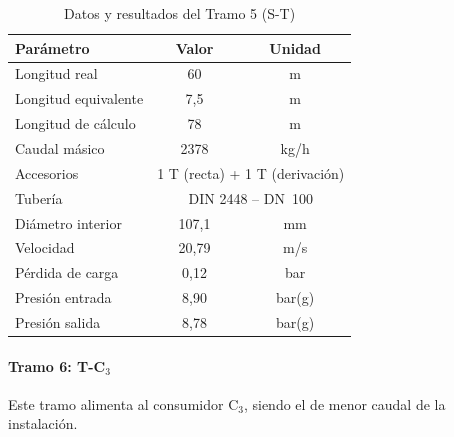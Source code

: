 \documentclass[12pt]{article}
\begin{document}
\begin{table}[H]
	\centering
	\caption{Datos y resultados del Tramo 5 (S-T)}
	\label{tab:tramo5}
	\begin{tabular}{lcc}
		\toprule
		\textbf{Parámetro}   & \textbf{Valor}                                     & \textbf{Unidad} \\
		\midrule
		Longitud real        & 60                                                 & m               \\
		Longitud equivalente & 7{,}5                                              & m               \\
		Longitud de cálculo  & 78                                                 & m               \\
		Caudal másico        & 2378                                               & kg/h            \\
		Accesorios           & \multicolumn{2}{c}{1 T (recta) + 1 T (derivación)}                   \\
		Tubería              & \multicolumn{2}{c}{DIN 2448 -- DN~100}                               \\
		Diámetro interior    & 107{,}1                                            & mm              \\
		Velocidad            & 20{,}79                                            & m/s             \\
		Pérdida de carga     & 0{,}12                                             & bar             \\
		Presión entrada      & 8{,}90                                             & bar(g)          \\
		Presión salida       & 8{,}78                                             & bar(g)          \\
		\bottomrule
	\end{tabular}
\end{table}

\paragraph{Tramo 6: T-C$_3$}

Este tramo alimenta al consumidor C$_3$, siendo el de menor caudal de la instalación.
\end{document}
